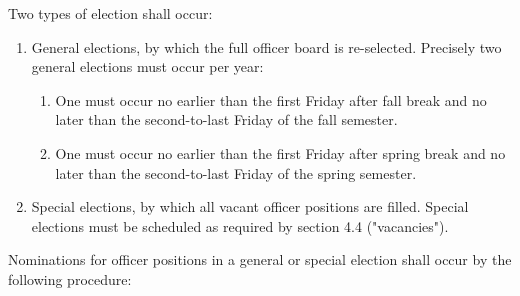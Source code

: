 \documentclass[11pt]{article}
\newcounter{h1}
\newcounter{h2}[h1]
\newcounter{h3}[h2]
\begin{document}


Two types of election shall occur: %

\begin{enumerate}
  \item General elections, by which the full officer board is re-selected. Precisely two general elections must occur per year:
  \begin{enumerate}
    \item One must occur no earlier than the first Friday after fall break and no later than the second-to-last Friday of the fall semester.
    \item One must occur no earlier than the first Friday after spring break and no later than the second-to-last Friday of the spring semester.
  \end{enumerate}
  \item Special elections, by which all vacant officer positions are filled. Special elections must be scheduled as required by section 4.4 ("vacancies").
\end{enumerate}


Nominations for officer positions in a general or special election shall occur by the following procedure:
\end{document}

